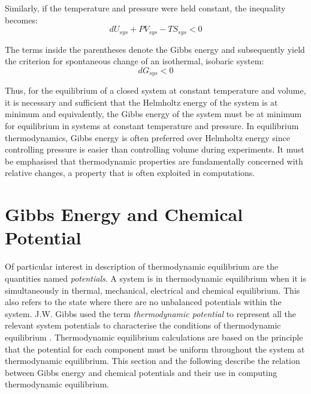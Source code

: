 		Similarly, if the temperature and pressure were held constant, the inequality becomes:
		\begin{equation}
			d{U_{sys} + PV_{sys} - TS_{sys} } < 0
		\end{equation}
		
		The terms inside the parentheses denote the Gibbs energy and subsequently yield the criterion for spontaneous change of an isothermal, isobaric system:
		\begin{equation}
			d{G_{sys} } < 0
		\end{equation}
		
		Thus, for the equilibrium of a closed system at constant temperature and volume, it is necessary and sufficient that the Helmholtz energy of the system is at minimum and equivalently, the Gibbs energy of the system must be at minimum for equilibrium in systems at constant temperature and pressure. In equilibrium thermodynamics, Gibbs energy is often preferred over Helmholtz energy since controlling pressure is easier than controlling volume during experiments. It must be emphasised that thermodynamic properties are fundamentally concerned with relative changes, a property that is often exploited in computations. 
		 
\section{Gibbs Energy and Chemical Potential}
	Of particular interest in description of  thermodynamic equilibrium are the quantities named \emph{potentials}. A system is in thermodynamic equilibrium when it is simultaneously in thermal, mechanical, electrical and chemical equilibrium. This also refers to the state where there are no unbalanced potentials within the system. J.W. Gibbs used the term \emph{thermodynamic potential} to represent all the relevant system potentials to characterise the conditions of thermodynamic equilibrium \cite{Gibbs:1878aa}. Thermodynamic equilibrium calculations are based on the principle that the potential for each component must be uniform throughout the system at thermodynamic equilibrium. This section and the following describe the relation between Gibbs energy and chemical potentials and their use in computing thermodynamic equilibrium. 
	
